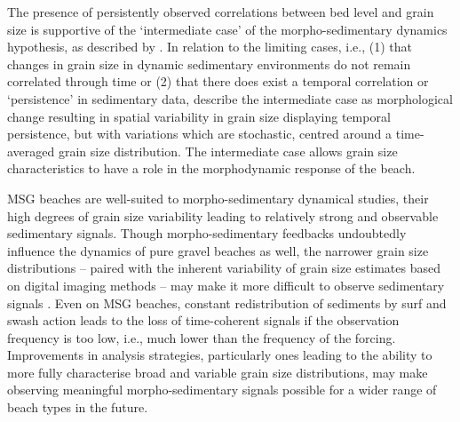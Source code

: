 The presence of persistently observed correlations between bed level and grain size is supportive of the `intermediate case' of the morpho-sedimentary dynamics hypothesis, as described by \citet{Buscombe_Masselink2006}. In relation to the limiting cases, i.e., (1) that changes in grain size in dynamic sedimentary environments do not remain correlated through time or (2) that there does exist a temporal correlation or `persistence' in sedimentary data, \citeauthor{Buscombe_Masselink2006} describe the intermediate case as morphological change resulting in spatial variability in grain size displaying temporal persistence, but with variations which are stochastic, centred around a time-averaged grain size distribution. The intermediate case allows grain size characteristics to have a role in the morphodynamic response of the beach. 

MSG beaches are well-suited to morpho-sedimentary dynamical studies, their high degrees of grain size variability leading to relatively strong and observable sedimentary signals. Though morpho-sedimentary feedbacks undoubtedly influence the dynamics of pure gravel beaches as well, the narrower grain size distributions -- paired with the inherent variability of grain size estimates based on digital imaging methods -- may make it more difficult to observe sedimentary signals \citep[see][]{Austin_Buscombe2008, Masselink_etal2007}. Even on MSG beaches, constant redistribution of sediments by surf and swash action leads to the loss of time-coherent signals if the observation frequency is too low, i.e., much lower than the frequency of the forcing. Improvements in analysis strategies, particularly ones leading to the ability to more fully characterise broad and variable grain size distributions, may make observing meaningful morpho-sedimentary signals possible for a wider range of beach types in the future.


